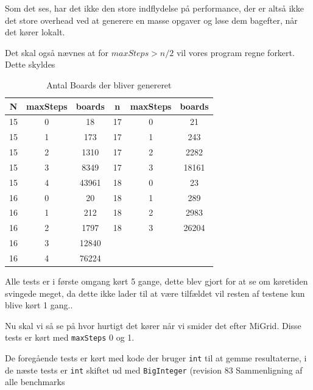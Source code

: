 Som det ses, har det ikke den store indflydelse på performance, der er altså
ikke det store overhead ved at generere en masse opgaver og løse dem bagefter,
når det kører lokalt. 

Det skal også nævnes at for $maxSteps>n/2$ vil vores program regne forkert.
Dette skyldes 

\begin{table}
	\begin{center}
		\begin{tabular}{|c|c|c|c|c|c|}
			\hline N  & maxSteps  & boards & n  & maxSteps & boards \\
			\hline 15 & 0         & 18     & 17 & 0        & 21     \\
			\hline 15 & 1         & 173    & 17 & 1        & 243    \\
			\hline 15 & 2         & 1310   & 17 & 2        & 2282   \\ 
			\hline 15 & 3         & 8349   & 17 & 3        & 18161  \\
			\hline 15 & 4         & 43961  & 18 & 0        & 23     \\
			\hline 16 & 0         & 20     & 18 & 1        & 289    \\
			\hline 16 & 1         & 212    & 18 & 2        & 2983   \\
			\hline 16 & 2         & 1797   & 18 & 3        & 26204  \\
			\hline 16 & 3         & 12840  &    &          &        \\
			\hline 16 & 4         & 76224  &    &          &        \\
			\hline
		\end{tabular}
		\caption{Antal Boards der bliver genereret}
		\label{tabel:noboards}
	\end{center}
\end{table}

Alle tests er i første omgang kørt 5 gange, dette blev gjort for at se om
køretiden svingede meget, da dette ikke lader til at være tilfældet vil resten
af testene kun blive kørt 1 gang.. 

Nu skal vi så se på hvor hurtigt det kører når vi smider det efter MiGrid. 
Disse tests er kørt med \texttt{maxSteps} 0 og 1.

De foregående tests er kørt med kode der bruger \texttt{int} til at gemme resultaterne,
i de næste tests er \texttt{int} skiftet ud med \texttt{BigInteger} (revision
83
\clearpage
Sammenligning af alle benchmarks

